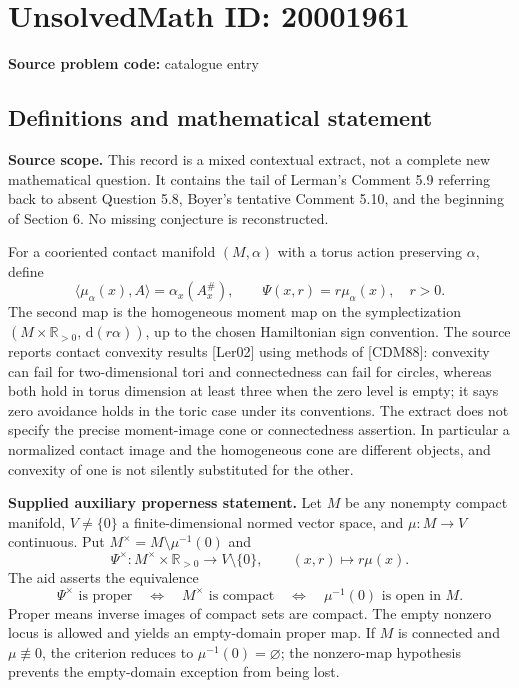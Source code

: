 \documentclass[11pt]{article}
\newcommand{\R}{\mathbb{R}}
\newcommand{\dd}{\,\mathrm{d}}
\begin{document}
\section*{UnsolvedMath ID: 20001961}
\textbf{Source problem code:} catalogue entry
\subsection{Definitions and mathematical statement}
\textbf{Source scope.} This record is a mixed contextual extract, not a complete new mathematical question. It contains the tail of Lerman's Comment 5.9 referring back to absent Question 5.8, Boyer's tentative Comment 5.10, and the beginning of Section 6. No missing conjecture is reconstructed.

For a cooriented contact manifold $(M,\alpha)$ with a torus action preserving $\alpha$, define
\[
 \langle\mu_\alpha(x),A\rangle=\alpha_x(A^\#_x),
 \qquad \Psi(x,r)=r\mu_\alpha(x),\quad r>0.
\]
The second map is the homogeneous moment map on the symplectization $(M\times\R_{>0},\dd(r\alpha))$, up to the chosen Hamiltonian sign convention. The source reports contact convexity results [Ler02] using methods of [CDM88]: convexity can fail for two-dimensional tori and connectedness can fail for circles, whereas both hold in torus dimension at least three when the zero level is empty; it says zero avoidance holds in the toric case under its conventions. The extract does not specify the precise moment-image cone or connectedness assertion. In particular a normalized contact image and the homogeneous cone are different objects, and convexity of one is not silently substituted for the other.

\textbf{Supplied auxiliary properness statement.} Let $M$ be any nonempty compact manifold, $V\ne\{0\}$ a finite-dimensional normed vector space, and $\mu:M\to V$ continuous. Put $M^\times=M\setminus\mu^{-1}(0)$ and
\[
 \Psi^\times:M^\times\times\R_{>0}\longrightarrow V\setminus\{0\},
 \qquad (x,r)\longmapsto r\mu(x).
\]
The aid asserts the equivalence
\[
 \Psi^\times\text{ is proper}
 \quad\Longleftrightarrow\quad M^\times\text{ is compact}
 \quad\Longleftrightarrow\quad \mu^{-1}(0)\text{ is open in }M.
\]
Proper means inverse images of compact sets are compact. The empty nonzero locus is allowed and yields an empty-domain proper map. If $M$ is connected and $\mu\not\equiv0$, the criterion reduces to $\mu^{-1}(0)=\varnothing$; the nonzero-map hypothesis prevents the empty-domain exception from being lost.
\end{document}
